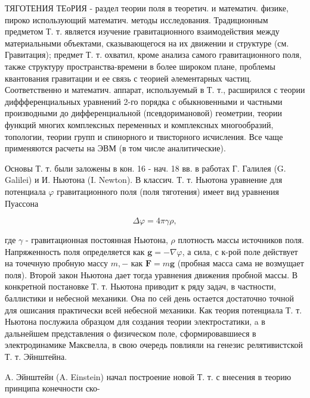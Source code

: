 \documentclass[10pt]{article}
\begin{document}
ТЯГОТЕНИЯ ТЕоРИЯ - раздел теории поля в теоретич. и математич. физике, пироко использующий математич. методы исследования. Традиционным предметом Т. т. является изучение гравитационного взаимодействия между материальными объектами, сказывающегося на их движении и структуре (см. Гравитация); предмет Т. т. охватил, кроме анализа самого гравитационного поля, также структуру пространства-времени в более широком плане, проблемы квантования гравитации и ее связь с теорией әлементарных частиц. Соответственно и математич. аппарат, используемый в Т. т., расширился с теории диффференциальных уравнений 2-го порядка с обыкновенными и частными производными до дифференциальной (псевдоримановой) геометрии, теории функций многих комплексных переменных и комплексных многообразий, топологии, теории групп и спинорного и твисторного исчисления. Все чаще применяются расчеты на ЭВМ (в том числе аналитические).



Основы Т. т. были заложены в кон. 16 - нач. 18 вв. в работах Г. Галилея (G. Galilei) и И. Ньютона (I. Newton). В классич. Т. т. Ньютона уравнение для потенциала $\varphi$ гравитационного поля (поля тяготения) имеет вид уравнения Пуассона



\[

\Delta \varphi=4 \pi \gamma \rho,

\]



где $\gamma$ - гравитационная постоянная Ньютона, $\rho$ плотность массы источников поля. Напряженность поля определяется как $\boldsymbol{g}=-\nabla \varphi$, а сила, с к-рой поле действует на точечную пробную массу $m,-$ как $\boldsymbol{F}=m \boldsymbol{g}$ (пробная масса сама не возмущает поля). Второй закон Ньютона дает тогда уравнения движения пробной массы. В конкретной постановке Т. т. Ньютона приводит к ряду задач, в частности, баллистики и небесной механики. Она по сей день остается достаточно точной для ошисания практически всей небесной механики. Как теория потенциала Т. т. Ньютона послужила образцом для создания теории электростатики, a в дальнейшем представления о физическом поле, сформировавшиеся в электродинамике Максвелла, в свою очередь повлияли на генезис релятивистской Т. т. Эйнштейна.



A. Эйнштейн (A. Einstein) начал построение новой Т. т. с внесения в теорию принципа конечности ско-
\end{document}
